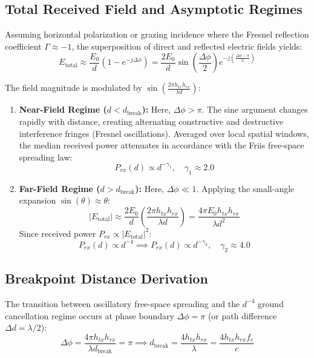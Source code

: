 \documentclass[11pt,a4paper]{article}
\begin{document}
\subsection{Total Received Field and Asymptotic Regimes}
Assuming horizontal polarization or grazing incidence where the Fresnel reflection coefficient $\Gamma \approx -1$, the superposition of direct and reflected electric fields yields:
\begin{equation}
E_{\text{total}} \approx \frac{E_0}{d} \left( 1 - e^{-j \Delta \phi} \right) = \frac{2 E_0}{d} \sin\left( \frac{\Delta \phi}{2} \right) e^{-j \left(\frac{\Delta \phi - \pi}{2}\right)}
\end{equation}

The field magnitude is modulated by $\sin\left(\frac{2\pi h_{tx} h_{rx}}{\lambda d}\right)$:

\begin{enumerate}
    \item \textbf{Near-Field Regime ($d < d_{\text{break}}$):} Here, $\Delta \phi > \pi$. The sine argument changes rapidly with distance, creating alternating constructive and destructive interference fringes (Fresnel oscillations). Averaged over local spatial windows, the median received power attenuates in accordance with the Friis free-space spreading law:
    \begin{equation}
    P_{rx}(d) \propto d^{-\gamma_1}, \quad \gamma_1 \approx 2.0
    \end{equation}
    
    \item \textbf{Far-Field Regime ($d > d_{\text{break}}$):} Here, $\Delta \phi \ll 1$. Applying the small-angle expansion $\sin(\theta) \approx \theta$:
    \begin{equation}
    |E_{\text{total}}| \approx \frac{2 E_0}{d} \left( \frac{2\pi h_{tx} h_{rx}}{\lambda d} \right) = \frac{4\pi E_0 h_{tx} h_{rx}}{\lambda d^2}
    \end{equation}
    Since received power $P_{rx} \propto |E_{\text{total}}|^2$:
    \begin{equation}
    P_{rx}(d) \propto d^{-4} \implies P_{rx}(d) \propto d^{-\gamma_2}, \quad \gamma_2 \approx 4.0
    \end{equation}
\end{enumerate}

\subsection{Breakpoint Distance Derivation}
The transition between oscillatory free-space spreading and the $d^{-4}$ ground cancellation regime occurs at phase boundary $\Delta \phi = \pi$ (or path difference $\Delta d = \lambda / 2$):
\begin{equation}
\Delta \phi = \frac{4\pi h_{tx} h_{rx}}{\lambda d_{\text{break}}} = \pi \implies d_{\text{break}} = \frac{4 h_{tx} h_{rx}}{\lambda} = \frac{4 h_{tx} h_{rx} f_c}{c}
\end{equation}
\end{document}
